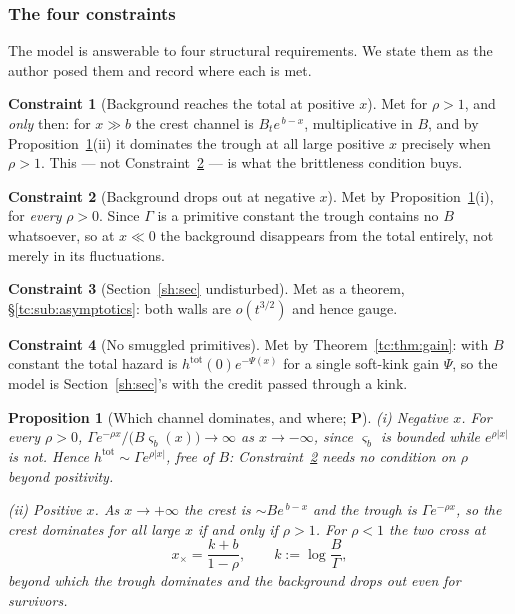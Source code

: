 \documentclass[11pt]{article}
\numberwithin{equation}{section}
\theoremstyle{plain}
\newtheorem{proposition}[theorem]{Proposition}
\theoremstyle{definition}
\newtheorem{constraint}{Constraint}
\theoremstyle{remark}
\begin{document}
\subsubsection{The four constraints}\label{tc:subsub:constraints}

The model is answerable to four structural requirements. We state them
as the author posed them and record where each is met.

\begin{constraint}[Background reaches the total at positive $x$]
\label{tc:C1}
Met for $\rho>1$, and \emph{only} then: for $x\gg b$ the crest channel
is $B_te^{\,b-x}$, multiplicative in $B$, and by
Proposition~\ref{tc:prop:dropout}(ii) it dominates the trough at all
large positive $x$ precisely when $\rho>1$. This --- not
Constraint~\ref{tc:C2} --- is what the brittleness condition buys.
\end{constraint}

\begin{constraint}[Background drops out at negative $x$]\label{tc:C2}
Met by Proposition~\ref{tc:prop:dropout}(i), for \emph{every} $\rho>0$.
Since $\Gamma$ is a primitive constant the trough contains no $B$
whatsoever, so at $x\ll0$ the background disappears from the total
entirely, not merely in its fluctuations.
\end{constraint}

\begin{constraint}[Section~\ref{sh:sec} undisturbed]\label{tc:C3}
Met as a theorem, \S\ref{tc:sub:asymptotics}: both walls are
$o(t^{3/2})$ and hence gauge.
\end{constraint}

\begin{constraint}[No smuggled primitives]\label{tc:C4}
Met by Theorem~\ref{tc:thm:gain}: with $B$ constant the total hazard is
$h^{\mathrm{tot}}(0)e^{-\Psi(x)}$ for a single soft-kink gain $\Psi$, so
the model is Section~\ref{sh:sec}'s with the credit passed through a kink.
\end{constraint}

\begin{proposition}[Which channel dominates, and where; \textbf{P}]
\label{tc:prop:dropout}
\emph{(i) Negative $x$.} For every $\rho>0$,
$\Gamma e^{-\rho x}/\bigl(B\varsigma_b(x)\bigr)\to\infty$ as
$x\to-\infty$, since $\varsigma_b$ is bounded while $e^{\rho|x|}$ is
not. Hence $h^{\mathrm{tot}}\sim\Gamma e^{\rho|x|}$, free of $B$:
Constraint~\ref{tc:C2} needs no condition on $\rho$ beyond positivity.

\emph{(ii) Positive $x$.} As $x\to+\infty$ the crest is
$\sim Be^{\,b-x}$ and the trough is $\Gamma e^{-\rho x}$, so the crest
dominates for all large $x$ if and only if $\rho>1$. For $\rho<1$ the
two cross at
\begin{equation}\label{tc:eq:crossover}
x_{\times}=\frac{k+b}{1-\rho},\qquad k:=\log\frac{B}{\Gamma},
\end{equation}
beyond which the trough dominates and the background drops out
\emph{even for survivors}.
\end{proposition}
\end{document}
